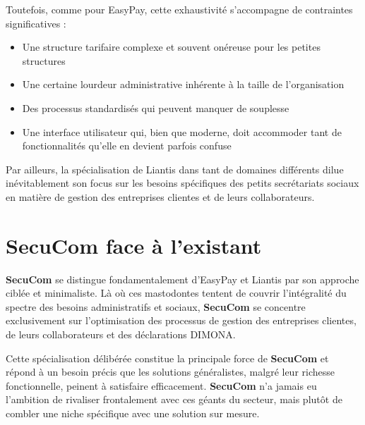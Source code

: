 \begin{tcolorbox}[
  title={\textbf{Contraintes de Liantis pour les petites structures}},
  colback=blue!5!white,
  colframe=primarycolor,
  fonttitle=\bfseries,
  boxrule=0.5mm,
  arc=2mm,
  left=6mm,
  right=6mm,
  top=6mm,
  bottom=6mm
]
\noindent Toutefois, comme pour EasyPay, cette exhaustivité s'accompagne de contraintes significatives :
\begin{itemize}[leftmargin=*,label=\textcolor{darkgray}{$\bullet$},itemsep=0.3em]
  \item Une structure tarifaire complexe et souvent onéreuse pour les petites structures
  \item Une certaine lourdeur administrative inhérente à la taille de l'organisation
  \item Des processus standardisés qui peuvent manquer de souplesse
  \item Une interface utilisateur qui, bien que moderne, doit accommoder tant de fonctionnalités qu'elle en devient parfois confuse
\end{itemize}
\end{tcolorbox}

\vspace{0.5cm}

\noindent Par ailleurs, la spécialisation de Liantis dans tant de domaines différents dilue inévitablement son focus sur les besoins spécifiques des petits secrétariats sociaux en matière de gestion des entreprises clientes et de leurs collaborateurs.

\section{SecuCom face à l'existant}

\noindent \textbf{SecuCom} se distingue fondamentalement d'EasyPay et Liantis par son approche ciblée et minimaliste. Là où ces mastodontes tentent de couvrir l'intégralité du spectre des besoins administratifs et sociaux, \textbf{SecuCom} se concentre exclusivement sur l'optimisation des processus de gestion des entreprises clientes, de leurs collaborateurs et des déclarations DIMONA.

\begin{note}
Cette spécialisation délibérée constitue la principale force de \textbf{SecuCom} et répond à un besoin précis que les solutions généralistes, malgré leur richesse fonctionnelle, peinent à satisfaire efficacement. \textbf{SecuCom} n'a jamais eu l'ambition de rivaliser frontalement avec ces géants du secteur, mais plutôt de combler une niche spécifique avec une solution sur mesure.
\end{note}

